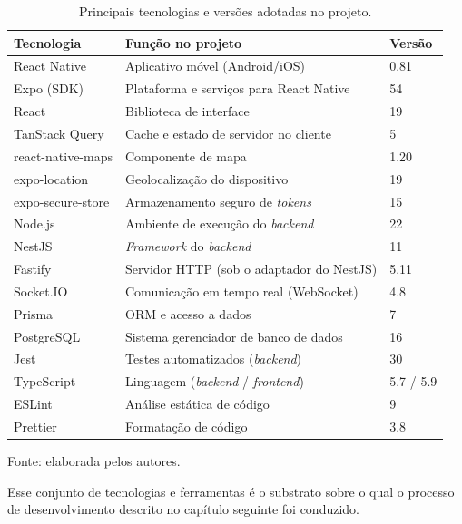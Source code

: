         \begin{table}[!htb]
            \centering
            \caption{Principais tecnologias e versões adotadas no projeto.}
            \label{tab:tecnologias}
            \begin{tabular}{|l|l|l|}
                \hline
                \textbf{Tecnologia} & \textbf{Função no projeto} & \textbf{Versão} \\ \hline
                React Native & Aplicativo móvel (Android/iOS) & 0.81 \\ \hline
                Expo (SDK) & Plataforma e serviços para React Native & 54 \\ \hline
                React & Biblioteca de interface & 19 \\ \hline
                TanStack Query & Cache e estado de servidor no cliente & 5 \\ \hline
                react-native-maps & Componente de mapa & 1.20 \\ \hline
                expo-location & Geolocalização do dispositivo & 19 \\ \hline
                expo-secure-store & Armazenamento seguro de \textit{tokens} & 15 \\ \hline
                Node.js & Ambiente de execução do \textit{backend} & 22 \\ \hline
                NestJS & \textit{Framework} do \textit{backend} & 11 \\ \hline
                Fastify & Servidor HTTP (sob o adaptador do NestJS) & 5.11 \\ \hline
                Socket.IO & Comunicação em tempo real (WebSocket) & 4.8 \\ \hline
                Prisma & ORM e acesso a dados & 7 \\ \hline
                PostgreSQL & Sistema gerenciador de banco de dados & 16 \\ \hline
                Jest & Testes automatizados (\textit{backend}) & 30 \\ \hline
                TypeScript & Linguagem (\textit{backend} / \textit{frontend}) & 5.7 / 5.9 \\ \hline
                ESLint & Análise estática de código & 9 \\ \hline
                Prettier & Formatação de código & 3.8 \\ \hline
            \end{tabular}

            \vspace{2pt}
            {\footnotesize Fonte: elaborada pelos autores.}
        \end{table}

        Esse conjunto de tecnologias e ferramentas é o substrato sobre o qual o processo de desenvolvimento descrito no capítulo seguinte foi conduzido.

